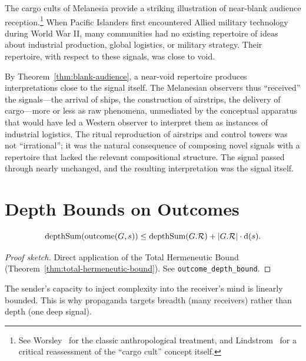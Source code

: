 \begin{example}
\label{ex:cargo-cults}
The cargo cults of Melanesia provide a striking illustration of
near-blank audience reception.\footnote{See Worsley~\cite{worsley1957}
for the classic anthropological treatment, and Lindstrom~\cite{lindstrom1993}
for a critical reassessment of the ``cargo cult'' concept itself.}  When
Pacific Islanders first encountered Allied military technology during
World War II, many communities had no existing repertoire of ideas about
industrial production, global logistics, or military strategy.  Their
repertoire, with respect to these signals, was close to void.

By Theorem~\ref{thm:blank-audience}, a near-void repertoire produces
interpretations close to the signal itself.  The Melanesian observers
thus ``received'' the signals---the arrival of ships, the construction
of airstrips, the delivery of cargo---more or less as raw phenomena,
unmediated by the conceptual apparatus that would have led a Western
observer to interpret them as instances of industrial logistics.  The
ritual reproduction of airstrips and control towers was not
``irrational''; it was the natural consequence of composing novel
signals with a repertoire that lacked the relevant compositional
structure.  The signal passed through nearly unchanged, and the
resulting interpretation was the signal itself.
\end{example}

\section{Depth Bounds on Outcomes}
\label{sec:ch2:depth}

\begin{theorem}
\label{thm:outcome-depth-bound}
\[
  \operatorname{depthSum}(\operatorname{outcome}(G, s))
  \leq \operatorname{depthSum}(G.\mathcal{R}) + |G.\mathcal{R}| \cdot \operatorname{d}(s).
\]
\end{theorem}

\begin{proof}[Proof sketch]
Direct application of the Total Hermeneutic Bound
(Theorem~\ref{thm:total-hermeneutic-bound}).
See \texttt{outcome\_depth\_bound}.
\end{proof}

\begin{remark}
The sender's capacity to inject complexity into the receiver's mind is
linearly bounded.  This is why propaganda targets breadth (many receivers)
rather than depth (one deep signal).
\end{remark}

